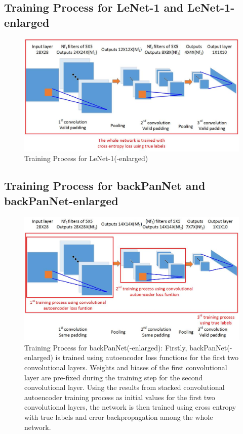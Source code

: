 \subsection{Training Process for LeNet-1 and LeNet-1-enlarged}


\begin{figure}[th]
\centering
\includegraphics[width=140mm]{Figures/LeNet-1-training}
\decoRule
\caption{Training Process for LeNet-1(-enlarged)}
\label{fig:LeNet-1-training}
\end{figure}

\subsection{Training Process for backPanNet and backPanNet-enlarged}


\begin{figure}[th]
\centering
\includegraphics[width=140mm]{Figures/backPanNet-training}
\decoRule
\caption{Training Process for backPanNet(-enlarged): Firstly, backPanNet(-enlarged) is trained using autoencoder loss functions for the first two convolutional layers. Weights and biases of the first convolutional layer are pre-fixed during the training step for the second convolutional layer. Using the results from stacked convolutional autoencoder training process as initial values for the first two convolutional layers, the network is then trained using cross entropy with true labels and error backpropagation among the whole network.}
\label{fig:backPanNet-training}
\end{figure}

